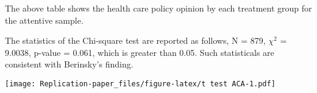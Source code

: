 \documentclass[AER]{AEA}
\begin{document}
\begin{table}

\caption{\label{tab:unnamed-chunk-11}Health care policy opinion (attentive sample)}
\centering
{}
\end{table}

The above table shows the health care policy opinion by each treatment
group for the attentive sample.

The statistics of the Chi-square test are reported as follows, N = 879,
\(\chi ^2\) = 9.0038, p-value = 0.061, which is greater than 0.05. Such
statisticals are consistent with Berinsky's finding.

\begin{table}

\caption{\label{tab:t test ACA}Statistics of support for Health care policy reform (attentive sample)}
\centering
{}
\end{table}

\texttt{[image: Replication-paper\_files/figure-latex/t test ACA-1.pdf]}
\end{document}
